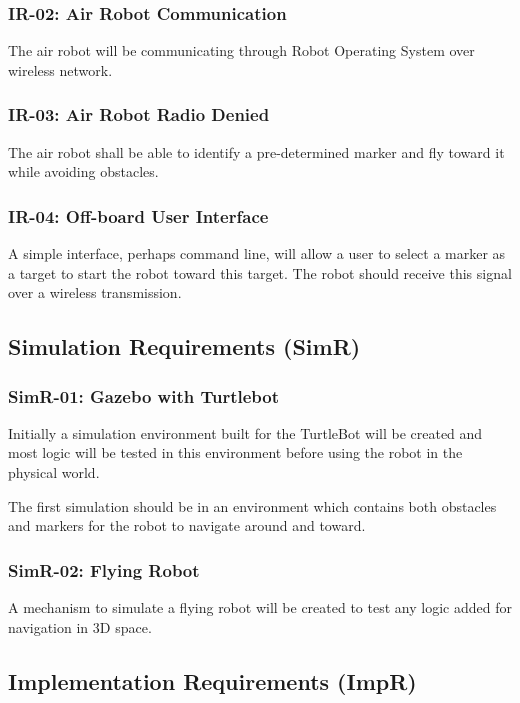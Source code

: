 \documentclass{article}
\begin{document}
		\subsubsection{IR-02: Air Robot Communication}
		
		The air robot will be communicating through Robot Operating System over wireless network.
		
		\subsubsection{IR-03: Air Robot Radio Denied}
		
		The air robot shall be able to identify a pre-determined marker and fly toward it while avoiding obstacles. 
		
		\subsubsection{IR-04: Off-board User Interface}
		
		A simple interface, perhaps command line, will allow a user to select a marker as a target to start the robot toward this target. The robot should receive this signal over a wireless transmission.
		
		
	\subsection{Simulation Requirements (SimR)}
	
		\subsubsection{SimR-01: Gazebo with Turtlebot}
		
		Initially a simulation environment built for the TurtleBot will be created and most logic will be tested in this environment before using the robot in the physical world.
		
		The first simulation should be in an environment which contains both obstacles and markers for the robot to navigate around and toward.
		
		\subsubsection{SimR-02: Flying Robot}
		
		A mechanism to simulate a flying robot will be created to test any logic added for navigation in 3D space.
		
	
	\subsection{Implementation Requirements (ImpR)}
	
\end{document}

